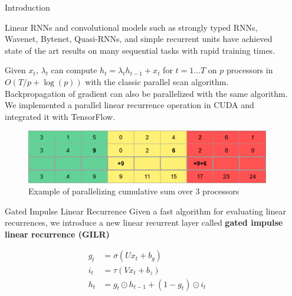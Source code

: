 \documentclass[final]{beamer}
\newlength{\sepwid}
\newlength{\onecolwid}
\begin{document}
\begin{frame}[t]
\begin{columns}[t]
\begin{column}{\onecolwid}
\begin{block}{Introduction}
\vspace{1ex}

Linear RNNs and convolutional models such as strongly typed RNNs, Wavenet, Bytenet,
Quasi-RNNs, and simple recurrent units
have achieved state of the art results on many sequential tasks with rapid training times.

\vspace{1ex}

Given $x_t$, $\lambda_t$ can compute $h_t=\lambda_t h_{t-1} + x_t$ for $t=1\ldots T$ on $p$
processors in $O(T/p + \log(p))$ with the classic parallel scan algorithm. Backpropagation
of gradient can also be parallelized with the same algorithm. We implemented a parallel linear
recurrence operation in CUDA and integrated it with TensorFlow.
\end{block}


\begin{figure}
\includegraphics[width=1.0\linewidth]{cumsum.png}
\caption{Example of parallelizing cumulative sum over 3 processors}
\end{figure}


\begin{block}{Gated Impulse Linear Recurrence}
Given a fast algorithm for evaluating linear recurrences, we introduce a new
linear recurrent layer called \textbf{gated impulse linear recurrence (GILR)}

\begin{align*}
g_t &= \sigma(Ux_t + b_g) \\
i_t &= \tau(Vx_t + b_z) \\
h_t &= g_t \odot h_{t-1} + (1-g_t)\odot i_t
\end{align*}
\end{block}


\end{column} %

\begin{column}{\sepwid}\end{column} %


\end{columns}
\end{frame}
\end{document}
